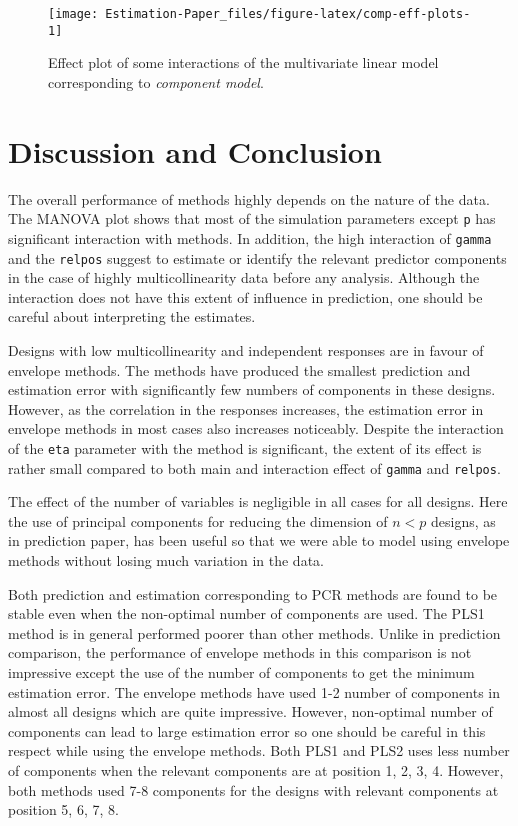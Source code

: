 \documentclass[12pt,3p,authoryear]{elsarticle}
\begin{document}
\begin{figure}[!htb]
\texttt{[image: Estimation-Paper\_files/figure-latex/comp-eff-plots-1]} \caption{Effect plot of some interactions of the multivariate linear model corresponding to \emph{component model}.}\label{fig:comp-eff-plots}
\end{figure}

\hypertarget{discussion-and-conclusion}{%
\section{Discussion and Conclusion}\label{discussion-and-conclusion}}

The overall performance of methods highly depends on the nature of the data. The MANOVA plot shows that most of the simulation parameters except \texttt{p} has significant interaction with methods. In addition, the high interaction of \texttt{gamma} and the \texttt{relpos} suggest to estimate or identify the relevant predictor components in the case of highly multicollinearity data before any analysis. Although the interaction does not have this extent of influence in prediction, one should be careful about interpreting the estimates.

Designs with low multicollinearity and independent responses are in favour of envelope methods. The methods have produced the smallest prediction and estimation error with significantly few numbers of components in these designs. However, as the correlation in the responses increases, the estimation error in envelope methods in most cases also increases noticeably. Despite the interaction of the \texttt{eta} parameter with the method is significant, the extent of its effect is rather small compared to both main and interaction effect of \texttt{gamma} and \texttt{relpos}.

The effect of the number of variables is negligible in all cases for all designs. Here the use of principal components for reducing the dimension of \(n<p\) designs, as in prediction paper, has been useful so that we were able to model using envelope methods without losing much variation in the data.

Both prediction and estimation corresponding to PCR methods are found to be stable even when the non-optimal number of components are used. The PLS1 method is in general performed poorer than other methods. Unlike in prediction comparison, the performance of envelope methods in this comparison is not impressive except the use of the number of components to get the minimum estimation error. The envelope methods have used 1-2 number of components in almost all designs which are quite impressive. However, non-optimal number of components can lead to large estimation error so one should be careful in this respect while using the envelope methods. Both PLS1 and PLS2 uses less number of components when the relevant components are at position 1, 2, 3, 4. However, both methods used 7-8 components for the designs with relevant components at position 5, 6, 7, 8.
\end{document}
